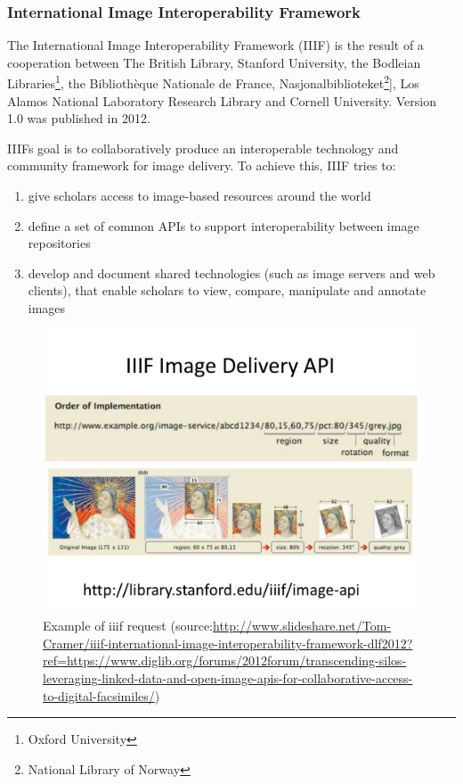\subsubsection{International Image Interoperability Framework}
The International Image Interoperability Framework (IIIF) is the result of a cooperation between The British Library, Stanford University, the Bodleian Libraries\footnote{Oxford University}, the Bibliothèque Nationale de France, Nasjonalbiblioteket\footnote{National Library of Norway}], Los Alamos National Laboratory Research Library and Cornell University\cite{Cramer11}. Version 1.0 was published in 2012.

IIIFs goal is to collaboratively produce an interoperable technology and community framework for image delivery\cite{web:iiif2}. To achieve this, IIIF tries to:
\begin{enumerate}[(1)]
	\item give scholars access to image-based resources around the world
	\item define a set of common APIs to support interoperability between image repositories
	\item develop and document shared technologies (such as image servers and web clients), that enable scholars to view, compare, manipulate and annotate images
\end{enumerate}

\begin{figure}[H]
	\begin{center}
		\includegraphics[scale=0.3]{img/iiif_url_example.jpg}
		\caption{Example of iiif request (source:\url{http://www.slideshare.net/Tom-Cramer/iiif-international-image-interoperability-framework-dlf2012?ref=https://www.diglib.org/forums/2012forum/transcending-silos-leveraging-linked-data-and-open-image-apis-for-collaborative-access-to-digital-facsimiles/})}
		\label{fig:fig2.3}
	\end{center}
\end{figure}


